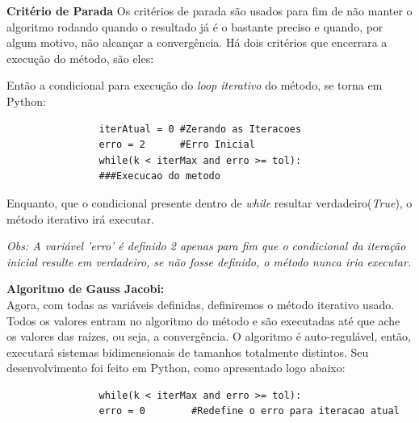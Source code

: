 \documentclass[
12pt,				%
openright,			%
twoside,			%
a4paper,			%
english,			%
french,				%
spanish,			%
brazil				%
]{abntex2_new}
\begin{document}
		\begin{alineas}
			\item{\textbf{Critério de Parada}
				Os critérios de parada são usados para fim de não manter o algoritmo rodando
				quando o 
				resultado já é o bastante preciso e quando, por algum motivo, não alcançar a
				convergência.
				Há dois critérios que encerrara a execução do método, são eles:
				
				Então a condicional para execução do \textit{loop iterativo} do método, se torna
				em Python:
				
				
				\begin{lstlisting}
				iterAtual = 0 #Zerando as Iteracoes
				erro = 2      #Erro Inicial
				while(k < iterMax and erro >= tol):
				###Execucao do metodo
				\end{lstlisting}
				
				Enquanto, que o condicional presente dentro de \textit{while} resultar
				verdadeiro(\textit{True}), o método iterativo irá executar.
				
				\textit{Obs: A variável 'erro' é definido 2 apenas para fim que o condicional da
					iteração inicial resulte em verdadeiro, se não fosse definido, o método nunca
					iria executar.}
				
				
				
				
			}
			
			\item{\textbf{Algoritmo de Gauss Jacobi:}\\
				Agora, com todas as variáveis definidas, definiremos o método iterativo usado.
				Todos os
				valores entram no algoritmo do método e são executadas até que ache os valores
				das raízes, ou seja, a convergência.
				O algoritmo é auto-regulável, então, executará sistemas bidimensionais de
				tamanhos totalmente distintos.
				Seu desenvolvimento foi feito em Python, como apresentado logo abaixo:\\
				\begin{lstlisting}
				while(k < iterMax and erro >= tol):
				erro = 0		#Redefine o erro para iteracao atual
				

\end{lstlisting}}
\end{alineas}
\end{document}
